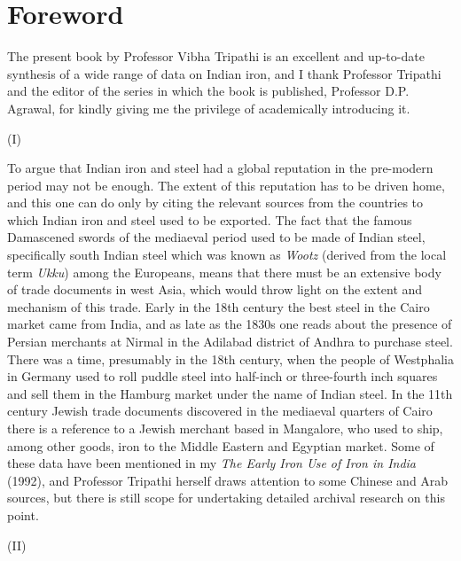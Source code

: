 
\chapter*{Foreword}

The present book by Professor Vibha Tripathi is an excellent and up-to-date synthesis of a wide range of data on Indian iron, and I thank Professor Tripathi and the editor of the series in which the book is published, Professor D.P. Agrawal, for kindly giving me the privilege of academically introducing it.

\begin{center}
(I)
\end{center}

To argue that Indian iron and steel had a global reputation in the pre-modern period may not be enough. The extent of this reputation has to be driven home, and this one can do only by citing the relevant sources from the countries to which Indian iron and steel used to be exported. The fact that the famous Damascened swords of the mediaeval period used to be made of Indian steel, specifically south Indian steel which was known as \textit{Wootz} (derived from the local term \textit{Ukku}) among the Europeans, means that there must be an extensive body of trade documents in west Asia, which would throw light on the extent and mechanism of this trade. Early in the 18th century the best steel in the Cairo market came from India, and as late as the 1830s one reads about the presence of Persian merchants at Nirmal in the Adilabad district of Andhra to purchase steel. There was a time, presumably in the 18th century, when the people of Westphalia in Germany used to roll puddle steel into half-inch or three-fourth inch squares and sell them in the Hamburg market under the name of Indian steel. In the 11th century Jewish trade documents discovered in the mediaeval quarters of Cairo there is a reference to a Jewish merchant based in Mangalore, who used to ship, among other goods, iron to the Middle Eastern and Egyptian market. Some of these data have been mentioned in my \textit{The Early Iron Use of Iron in India} (1992), and Professor Tripathi herself draws attention to some Chinese and Arab sources, but there is still scope for undertaking detailed archival research on this point.

\begin{center}
(II)
\end{center}

